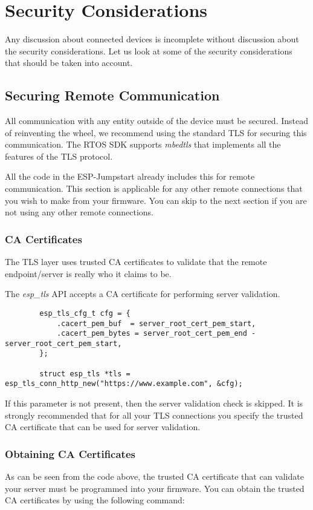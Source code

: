 \documentclass[main.tex]{subfiles}
\begin{document}
\chapter{Security Considerations}

Any discussion about connected devices is incomplete without discussion about the security considerations. Let us look at some of the security considerations that should be taken into account.

\section{Securing Remote Communication}
All communication with any entity outside of the device must be secured. Instead of reinventing the wheel, we recommend using the standard TLS for securing this communication. The RTOS SDK supports \textit{mbedtls} that implements all the features of the TLS protocol.

All the code in the ESP-Jumpstart already includes this for remote communication. This section is applicable for any other remote connections that you wish to make from your firmware. You can skip to the next section if you are not using any other remote connections.

\subsection{CA Certificates}
The TLS layer uses trusted CA certificates to validate that the remote endpoint/server is really who it claims to be.

The \textit{esp\_tls} API accepts a CA certificate for performing server validation.

\begin{verbatim}
        esp_tls_cfg_t cfg = {
            .cacert_pem_buf  = server_root_cert_pem_start,
            .cacert_pem_bytes = server_root_cert_pem_end - server_root_cert_pem_start,
        };

        struct esp_tls *tls = esp_tls_conn_http_new("https://www.example.com", &cfg);
\end{verbatim}

If this parameter is not present, then the server validation check is skipped. It is strongly recommended that for all your TLS connections you specify the trusted CA certificate that can be used for server validation.

\subsection{Obtaining CA Certificates}
As can be seen from the code above, the trusted CA certificate that can validate your server must be programmed into your firmware. You can obtain the trusted CA certificates by using the following command:
\end{document}
